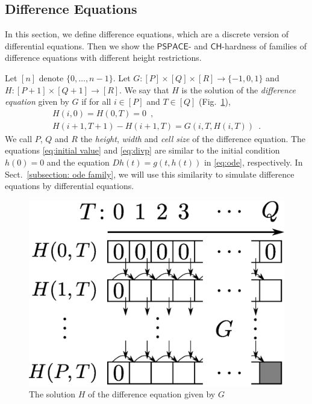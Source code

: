 \documentclass[12pt,a4paper]{article}
\theoremstyle{definition}
\theoremstyle{remark}
\newcommand{\D}{D}
\newcommand{\classPSPACE}{\mathsf{PSPACE}}
\newcommand{\classCH}{\mathsf{CH}}
\begin{document}
\subsection{Difference Equations}
\label{section:divp}

In this section, we define difference equations, 
which are a discrete version of differential equations. 
Then we show the $\classPSPACE$- and $\classCH$-hardness of 
families of difference equations with different height restrictions. 

Let $[n]$ denote $\{0, \dots , n-1\}$.
Let $G \colon [P] \times [Q] \times [R] \to \{-1, 0, 1\}$ and
$H \colon [P + 1] \times [Q+1] \to [R]$. 
We say that $H$ is the solution of the \emph{difference equation} given by $G$
if for all $i \in [P]$ and $T \in [Q]$ (Fig.~\ref{fig:divp}), 
\begin{gather}
   H(i, 0) = H(0, T) = 0 \enspace , \label{eq:initial value}
\\
   H(i + 1, T + 1) - H(i+1, T) = G(i, T, H(i, T)) \enspace .  \label{eq:divp}
\end{gather}
We call $P$, $Q$ and $R$ the \emph{height}, \emph{width} and \emph{cell size} of
the difference equation.
The equations \eqref{eq:initial value} and \eqref{eq:divp} are similar to 
the initial condition $h(0) = 0$ and the equation $\D h(t) = g(t, h(t))$ 
in \eqref{eq:ode}, respectively.
In Sect.~\ref{subsection: ode family}, 
we will use this similarity to simulate difference equations by differential equations.

\begin{figure}
 \begin{center}
  \includegraphics[height=0.15\textheight]{image/divp.eps}
 \end{center}
 \caption{The solution $H$ of the difference equation given by $G$}
 \label{fig:divp}
\end{figure}
\end{document}

